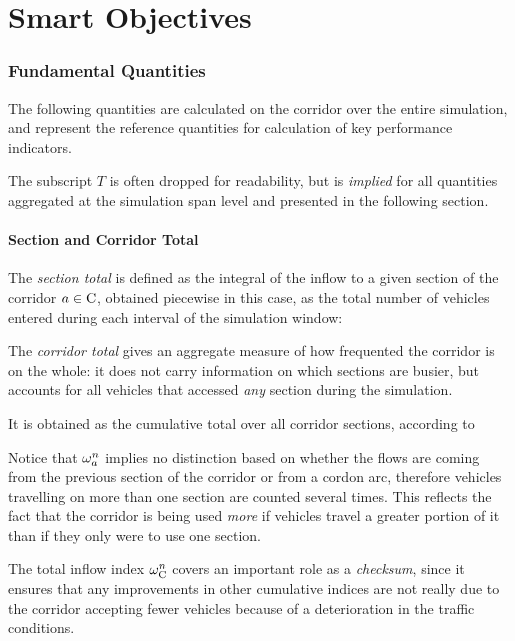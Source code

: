 \chapter{Smart Objectives}


\subsection{Fundamental Quantities}
The following quantities are calculated on the corridor over the entire simulation, and represent the reference quantities for calculation of key performance indicators.

The subscript $T$ is often dropped for readability, but is \emph{implied} for all quantities aggregated at the simulation span level and presented in the following section. 

\subsubsection*{Section and Corridor Total}
The \emph{section total} is defined as the integral of the inflow to a given section of the corridor $a \in \mathrm{C}$, obtained piecewise in this case, as the total number of vehicles entered during each interval of the simulation window:

The \emph{corridor total} gives an aggregate measure of how frequented the corridor is on the whole: it does not carry information on which sections are busier, but accounts for all vehicles that accessed \emph{any} section during the simulation.

It is obtained as the cumulative total over all corridor sections, according to

Notice that $\omega_{a}^{n}$ implies no distinction based on whether the flows are coming from the previous section of the corridor or from a cordon arc, therefore vehicles travelling on more than one section are counted several times. 
This reflects the fact that the corridor is being used \emph{more} if vehicles travel a greater portion of it than if they only were to use one section.

The total inflow index $\omega_{\mathrm{C}}^{n}$ covers an important role as a \emph{checksum}, since it ensures that any improvements in other cumulative indices are not really due to the corridor accepting fewer vehicles because of a deterioration in the traffic conditions.

